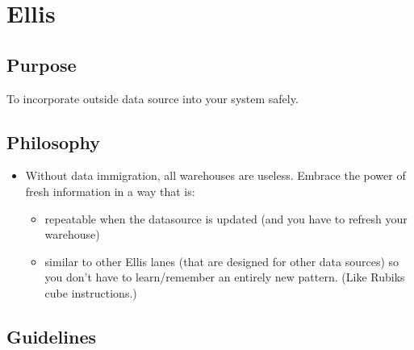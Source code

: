 \documentclass[
]{book}
\providecommand{\tightlist}{%
  \setlength{\itemsep}{0pt}\setlength{\parskip}{0pt}}
\begin{document}
\hypertarget{pattern-ellis}{%
\section{Ellis}\label{pattern-ellis}}

\hypertarget{purpose}{%
\subsection{Purpose}\label{purpose}}

To incorporate outside data source into your system safely.

\hypertarget{philosophy}{%
\subsection{Philosophy}\label{philosophy}}

\begin{itemize}
\tightlist
\item
  Without data immigration, all warehouses are useless. Embrace the power of fresh information in a way that is:

  \begin{itemize}
  \tightlist
  \item
    repeatable when the datasource is updated (and you have to refresh your warehouse)
  \item
    similar to other Ellis lanes (that are designed for other data sources) so you don't have to learn/remember an entirely new pattern. (Like Rubiks cube instructions.)
  \end{itemize}
\end{itemize}

\hypertarget{guidelines}{%
\subsection{Guidelines}\label{guidelines}}
\end{document}
